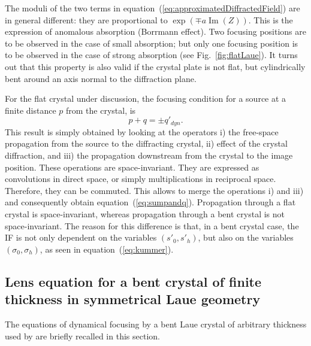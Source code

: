 \documentclass[preprint]{iucr}              %
\newcommand{\inred}[1]{{\color{red}#1}}
\begin{document}
The moduli of the two terms in equation~(\ref{eq:approximatedDiffractedField}) are in general different: they are proportional to $\exp(\mp a \operatorname{Im}(Z))$. This is the expression of anomalous absorption (Borrmann effect). Two focusing positions are to be observed in the case of small absorption; but only one focusing position is to be observed in the case of strong absorption (see Fig.~\ref{fig:flatLaue}). It turns out that this property is also valid if the crystal plate is not flat, but cylindrically bent around an axis normal to the diffraction plane. 

For the flat crystal under discussion, the focusing condition for a source at a finite distance $p$ from the crystal, is 
\begin{equation}
    \label{eq:sumpandq}
    p+q=\pm q'_{dyn}.
\end{equation}
This result is simply obtained by looking at the operators i) the free-space propagation from the source to the diffracting crystal, ii) effect of the crystal diffraction, and iii) the propagation downstream from the crystal to the image position. These operations  are space-invariant. They are expressed as convolutions in direct space, or simply multiplications in reciprocal space. Therefore, they can be commuted. This allows to merge the operations i) and iii) and consequently obtain equation~(\ref{eq:sumpandq}).
Propagation through a flat crystal is space-invariant, whereas propagation through a bent crystal is not space-invariant. The reason for this difference is that, in a bent crystal case, the IF is not only dependent on the variables $(s'_0,s'_h)$, but also on the variables $(\sigma_0,\sigma_h)$, as seen in equation~(\ref{eq:kummer}).



\subsection{Lens equation for a bent crystal of finite thickness in symmetrical Laue geometry}
\label{sec:LaueNewCLE}

\inred{The equations of dynamical focusing by a bent Laue crystal of arbitrary thickness used by \cite{GuigayFerrero2016} are briefly recalled in this section.}
\end{document}
